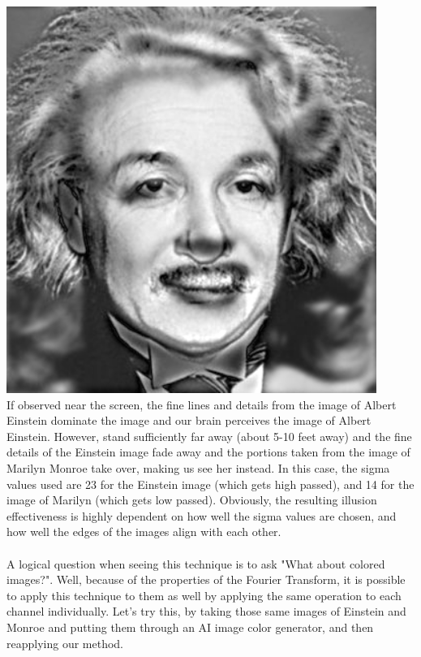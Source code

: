 \documentclass[notitlepage]{article}
\begin{document}
\includegraphics[width=4.75in]{../samples/images/einstein_monroe.png}
\\
If observed near the screen, the fine lines and details from the image of Albert Einstein dominate
the image and our brain perceives the image of Albert Einstein. However, stand sufficiently far away
(about 5-10 feet away) and the fine details of the Einstein image fade away and the portions taken from
the image of Marilyn Monroe take over, making us see her instead.
In this case, the sigma values used are 23 for the Einstein image (which gets high passed), and 14 for the image
of Marilyn (which gets low passed). Obviously, the resulting illusion effectiveness is highly dependent on how well
the sigma values are chosen, and how well the edges of the images align with each other.
\\\\
A logical question when seeing this technique is to ask "What about colored images?". Well, because of the properties of the
Fourier Transform, it is possible to apply this technique to them as well by applying the same operation to each channel individually.
Let's try this, by taking those same images of Einstein and Monroe and putting them through an AI image color generator, and then reapplying
our method.
\\
\end{document}
